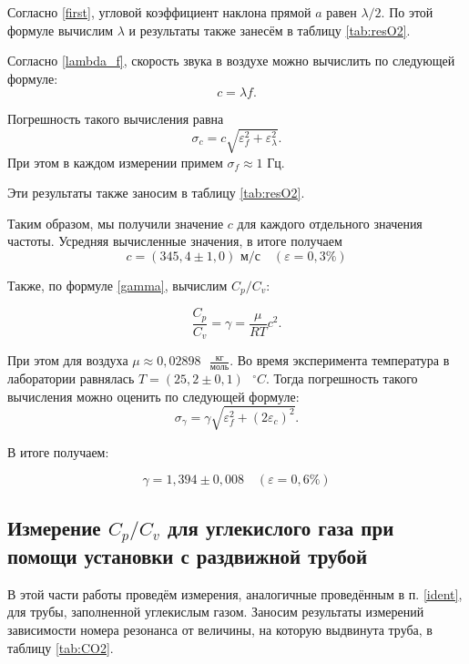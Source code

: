 \documentclass[a4paper,12pt]{article} %
\begin{document}
Согласно \eqref{first}, угловой коэффициент наклона прямой $ a $ равен $ \lambda/2 $. По этой формуле вычислим $ \lambda $ и результаты также занесём в таблицу \ref{tab:resO2}.

Согласно \eqref{lambda_f}, скорость звука в воздухе можно вычислить по следующей формуле: 
\[ c = \lambda f. \]

Погрешность такого вычисления равна \[ \sigma_c=c\sqrt{\varepsilon_f^2+\varepsilon_\lambda^2}. \] При этом в каждом измерении примем $ \sigma_f \approx 1 $ Гц.

Эти результаты также заносим в таблицу \ref{tab:resO2}.

Таким образом, мы получили значение $ c $ для каждого отдельного значения частоты. Усредняя вычисленные значения, в итоге получаем \[\boxed{ c = (345,4 \pm 1,0) \text{ м/с}}\quad (\varepsilon=0,3\%) \]

Также, по формуле \eqref{gamma}, вычислим $ C_p/C_v $:

\[ \frac{C_p}{C_v} = \gamma = \frac{\mu}{RT}c^2. \]

При этом для воздуха $ \displaystyle \mu \approx 0,02898 \text{ } \frac{\text{кг}}{\text{моль}} $. Во время эксперимента температура в лаборатории равнялась $ T = (25,2 \pm 0,1) \text{ } ^\circ C $. Тогда погрешность такого вычисления можно оценить по следующей формуле:
\[ \sigma_\gamma = \gamma\sqrt{\varepsilon_f^2+\left(2\varepsilon_c\right)^2}.\]

В итоге получаем:

\[ \boxed{\gamma = 1,394 \pm 0,008}\quad (\varepsilon=0,6\%) \]

\subsection{Измерение $ C_p/C_v $ для углекислого газа при помощи установки с раздвижной трубой}

В этой части работы проведём измерения, аналогичные проведённым в п. \ref{ident}, для трубы, заполненной углекислым газом. Заносим результаты измерений зависимости номера резонанса от величины, на которую выдвинута труба, в таблицу \ref{tab:CO2}.
\end{document}
